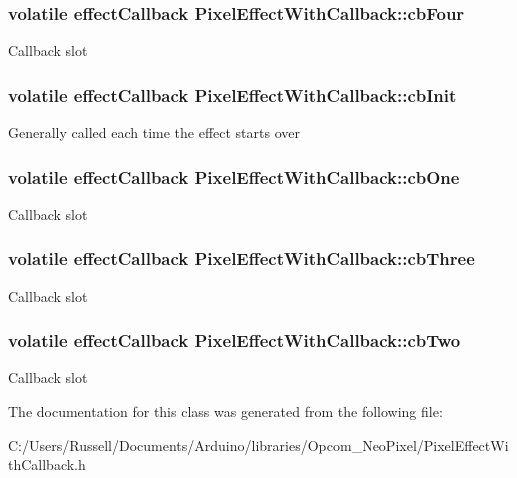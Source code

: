 \subsubsection[{cb\+Four}]{\setlength{\rightskip}{0pt plus 5cm}volatile effect\+Callback Pixel\+Effect\+With\+Callback\+::cb\+Four}\label{class_pixel_effect_with_callback_af4cb7aabda135c035b1b22be904a9b31}
Callback slot 
\subsubsection[{cb\+Init}]{\setlength{\rightskip}{0pt plus 5cm}volatile effect\+Callback Pixel\+Effect\+With\+Callback\+::cb\+Init}\label{class_pixel_effect_with_callback_adf8386da3ed650d11ab7726f230d1c82}
Generally called each time the effect starts over 
\subsubsection[{cb\+One}]{\setlength{\rightskip}{0pt plus 5cm}volatile effect\+Callback Pixel\+Effect\+With\+Callback\+::cb\+One}\label{class_pixel_effect_with_callback_ae1e33696e8c1e804c461f494a75ad80b}
Callback slot 
\subsubsection[{cb\+Three}]{\setlength{\rightskip}{0pt plus 5cm}volatile effect\+Callback Pixel\+Effect\+With\+Callback\+::cb\+Three}\label{class_pixel_effect_with_callback_a9a17951a4ceb3bfdec65e76fcab205cf}
Callback slot 
\subsubsection[{cb\+Two}]{\setlength{\rightskip}{0pt plus 5cm}volatile effect\+Callback Pixel\+Effect\+With\+Callback\+::cb\+Two}\label{class_pixel_effect_with_callback_a9b4650c131be4d95444e17ca31bd7067}
Callback slot 

The documentation for this class was generated from the following file\+:\begin{DoxyCompactItemize}
\item 
C\+:/\+Users/\+Russell/\+Documents/\+Arduino/libraries/\+Opcom\+\_\+\+Neo\+Pixel/Pixel\+Effect\+With\+Callback.\+h\end{DoxyCompactItemize}
